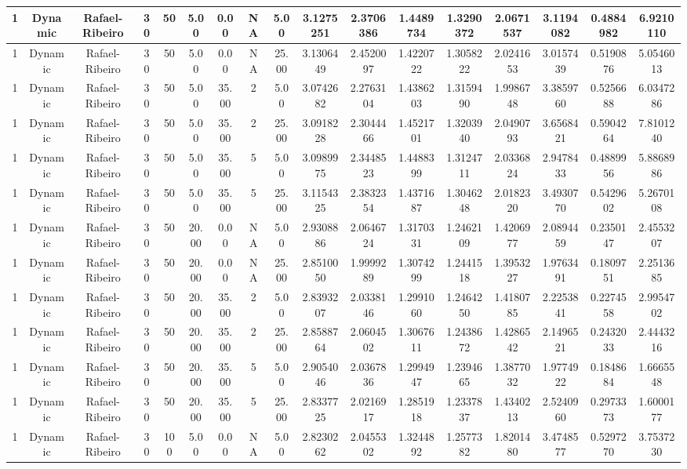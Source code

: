 \begin{longtable}{ | c | c | c | c | c | c | c | c | c | c | c | c | c | c | c | c | c | }
	\hline
	1	&	Dynamic	&	Rafael-Ribeiro	&	30	&	50	&	5.00	&	0.00	&	NA	&	5.00	&	3.1275251	&	2.3706386	&	1.4489734	&	1.3290372	&	2.0671537	&	3.1194082	&	0.4884982	&	6.9210110 \\
	\hline
	1	&	Dynamic	&	Rafael-Ribeiro	&	30	&	50	&	5.00	&	0.00	&	NA	&	25.00	&	3.1306449	&	2.4520097	&	1.4220722	&	1.3058222	&	2.0241653	&	3.0157439	&	0.5190876	&	5.0546013 \\
	\hline
	1	&	Dynamic	&	Rafael-Ribeiro	&	30	&	50	&	5.00	&	35.00	&	2	&	5.00	&	3.0742682	&	2.2763104	&	1.4386203	&	1.3159490	&	1.9986748	&	3.3859760	&	0.5256688	&	6.0347286 \\
	\hline
	1	&	Dynamic	&	Rafael-Ribeiro	&	30	&	50	&	5.00	&	35.00	&	2	&	25.00	&	3.0918228	&	2.3044466	&	1.4521701	&	1.3203940	&	2.0490793	&	3.6568421	&	0.5904264	&	7.8101240 \\
	\hline
	1	&	Dynamic	&	Rafael-Ribeiro	&	30	&	50	&	5.00	&	35.00	&	5	&	5.00	&	3.0989975	&	2.3448523	&	1.4488399	&	1.3124711	&	2.0336824	&	2.9478433	&	0.4889956	&	5.8868986 \\
	\hline
	1	&	Dynamic	&	Rafael-Ribeiro	&	30	&	50	&	5.00	&	35.00	&	5	&	25.00	&	3.1154325	&	2.3832354	&	1.4371687	&	1.3046248	&	2.0182320	&	3.4930770	&	0.5429602	&	5.2670108 \\
	\hline
	1	&	Dynamic	&	Rafael-Ribeiro	&	30	&	50	&	20.00	&	0.00	&	NA	&	5.00	&	2.9308886	&	2.0646724	&	1.3170331	&	1.2462109	&	1.4206977	&	2.0894459	&	0.2350147	&	2.4553207 \\
	\hline
	1	&	Dynamic	&	Rafael-Ribeiro	&	30	&	50	&	20.00	&	0.00	&	NA	&	25.00	&	2.8510050	&	1.9999289	&	1.3074299	&	1.2441518	&	1.3953227	&	1.9763491	&	0.1809751	&	2.2513685 \\
	\hline
	1	&	Dynamic	&	Rafael-Ribeiro	&	30	&	50	&	20.00	&	35.00	&	2	&	5.00	&	2.8393207	&	2.0338146	&	1.2991060	&	1.2464250	&	1.4180785	&	2.2253841	&	0.2274558	&	2.9954702 \\
	\hline
	1	&	Dynamic	&	Rafael-Ribeiro	&	30	&	50	&	20.00	&	35.00	&	2	&	25.00	&	2.8588764	&	2.0604502	&	1.3067611	&	1.2438672	&	1.4286542	&	2.1496521	&	0.2432033	&	2.4443216 \\
	\hline
	1	&	Dynamic	&	Rafael-Ribeiro	&	30	&	50	&	20.00	&	35.00	&	5	&	5.00	&	2.9054046	&	2.0367836	&	1.2994947	&	1.2394665	&	1.3877032	&	1.9774922	&	0.1848684	&	1.6665548 \\
	\hline
	1	&	Dynamic	&	Rafael-Ribeiro	&	30	&	50	&	20.00	&	35.00	&	5	&	25.00	&	2.8337725	&	2.0216917	&	1.2851918	&	1.2337837	&	1.4340213	&	2.5240960	&	0.2973373	&	1.6000177 \\
	\hline
	1	&	Dynamic	&	Rafael-Ribeiro	&	30	&	100	&	5.00	&	0.00	&	NA	&	5.00	&	2.8230262	&	2.0455302	&	1.3244892	&	1.2577382	&	1.8201480	&	3.4748577	&	0.5297270	&	3.7537230 \\

\end{longtable}
